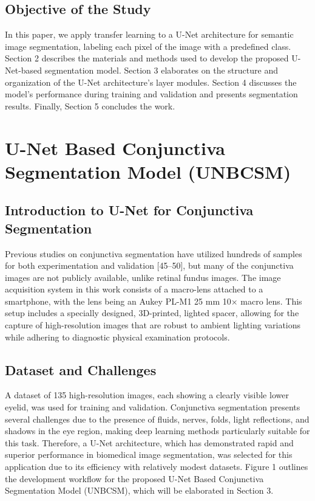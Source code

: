 \documentclass[conference]{IEEEtran}
\begin{document}
\subsection{\textbf{Objective of the Study}}
In this paper, we apply transfer learning to a U-Net architecture for semantic image segmentation, labeling each pixel of the image with a predefined class. Section 2 describes the materials and methods used to develop the proposed U-Net-based segmentation model. Section 3 elaborates on the structure and organization of the U-Net architecture's layer modules. Section 4 discusses the model's performance during training and validation and presents segmentation results. Finally, Section 5 concludes the work.

\section{\textbf{U-Net Based Conjunctiva Segmentation Model (UNBCSM)}}

\subsection{\textbf{Introduction to U-Net for Conjunctiva Segmentation}}
Previous studies on conjunctiva segmentation have utilized hundreds of samples for both experimentation and validation [45–50], but many of the conjunctiva images are not publicly available, unlike retinal fundus images. The image acquisition system in this work consists of a macro-lens attached to a smartphone, with the lens being an Aukey PL-M1 25 mm 10× macro lens. This setup includes a specially designed, 3D-printed, lighted spacer, allowing for the capture of high-resolution images that are robust to ambient lighting variations while adhering to diagnostic physical examination protocols. 

\subsection{\textbf{Dataset and Challenges}}
A dataset of 135 high-resolution images, each showing a clearly visible lower eyelid, was used for training and validation. Conjunctiva segmentation presents several challenges due to the presence of fluids, nerves, folds, light reflections, and shadows in the eye region, making deep learning methods particularly suitable for this task. Therefore, a U-Net architecture, which has demonstrated rapid and superior performance in biomedical image segmentation, was selected for this application due to its efficiency with relatively modest datasets. Figure 1 outlines the development workflow for the proposed U-Net Based Conjunctiva Segmentation Model (UNBCSM), which will be elaborated in Section 3.
\end{document}
